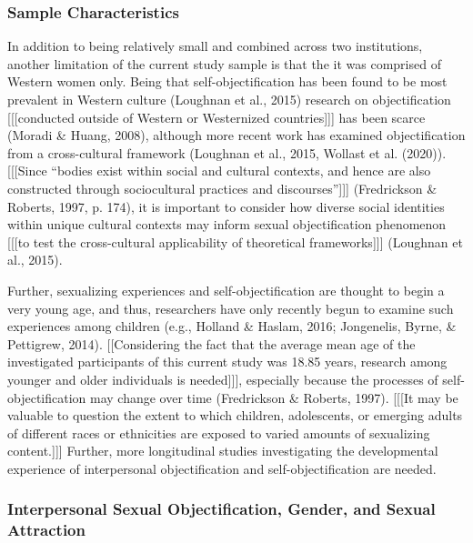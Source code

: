 \documentclass[man]{apa6}
\begin{document}
\subsubsection{Sample Characteristics}\label{sample-characteristics}

In addition to being relatively small and combined across two
institutions, another limitation of the current study sample is that the
it was comprised of Western women only. Being that self-objectification
has been found to be most prevalent in Western culture (Loughnan et al.,
2015) research on objectification {[}{[}{[}conducted outside of Western
or Westernized countries{]}{]}{]} has been scarce (Moradi \& Huang,
2008), although more recent work has examined objectification from a
cross-cultural framework (Loughnan et al., 2015, Wollast et al. (2020)).
{[}{[}{[}Since \enquote{bodies exist within social and cultural
contexts, and hence are also constructed through sociocultural practices
and discourses}{]}{]}{]} (Fredrickson \& Roberts, 1997, p. 174), it is
important to consider how diverse social identities within unique
cultural contexts may inform sexual objectification phenomenon
{[}{[}{[}to test the cross-cultural applicability of theoretical
frameworks{]}{]}{]} (Loughnan et al., 2015).

Further, sexualizing experiences and self-objectification are thought to
begin a very young age, and thus, researchers have only recently begun
to examine such experiences among children (e.g., Holland \& Haslam,
2016; Jongenelis, Byrne, \& Pettigrew, 2014). {[}{[}Considering the fact
that the average mean age of the investigated participants of this
current study was 18.85 years, research among younger and older
individuals is needed{]}{]}{]}, especially because the processes of
self-objectification may change over time (Fredrickson \& Roberts,
1997). {[}{[}{[}It may be valuable to question the extent to which
children, adolescents, or emerging adults of different races or
ethnicities are exposed to varied amounts of sexualizing
content.{]}{]}{]} Further, more longitudinal studies investigating the
developmental experience of interpersonal objectification and
self-objectification are needed.

\subsubsection{Interpersonal Sexual Objectification, Gender, and Sexual
Attraction}\label{interpersonal-sexual-objectification-gender-and-sexual-attraction}
\end{document}
